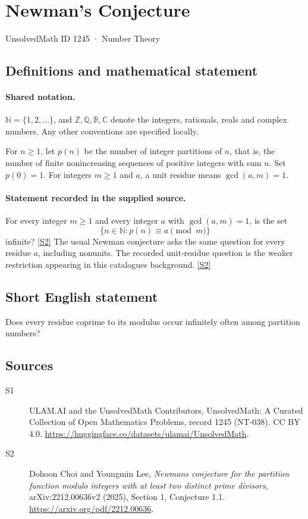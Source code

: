 \documentclass[11pt]{article}
\newcommand{\sref}[2]{\hyperlink{source:#1:#2}{[S#2]}}
\begin{document}
\setcounter{section}{1244}
\section{Newman's Conjecture}\label{1245}
{\small\sffamily UnsolvedMath ID 1245 · Number Theory}
\subsection{Definitions and mathematical statement}

\paragraph{Shared notation.}$\mathbb N=\{1,2,\ldots\}$, and $\mathbb Z,\mathbb Q,\mathbb R,\mathbb C$ denote the integers, rationals, reals and complex numbers. Any other conventions are specified locally.


For $n\geq1$, let $p(n)$ be the number of integer partitions of $n$, that is, the number of finite nonincreasing sequences of positive integers with sum $n$. Set $p(0)=1$. For integers $m\geq1$ and $a$, a unit residue means $\gcd(a,m)=1$.
\paragraph{Statement recorded in the supplied source.}
For every integer $m\geq1$ and every integer $a$ with $\gcd(a,m)=1$, is the set
\[
\{n\in\mathbb N:p(n)\equiv a\pmod m\}
\]
infinite? \sref{1245}{2}
The usual Newman conjecture asks the same question for every residue $a$, including nonunits. The recorded unit-residue question is the weaker restriction appearing in this catalogue\textquotesingle s background. \sref{1245}{2}
\subsection{Short English statement}
Does every residue coprime to its modulus occur infinitely often among partition numbers?
\subsection{Sources}
\begin{description}
\item[\hypertarget{source:1245:1}{S1}] ULAM.AI and the UnsolvedMath Contributors, UnsolvedMath: A Curated Collection of Open Mathematics Problems, record 1245 (NT-038). CC BY 4.0. \url{https://huggingface.co/datasets/ulamai/UnsolvedMath}.
\item[\hypertarget{source:1245:2}{S2}] Dohoon Choi and Youngmin Lee, \emph{Newman\textquotesingle s conjecture for the partition function modulo integers with at least two distinct prime divisors}, arXiv:2212.00636v2 (2025), Section 1, Conjecture 1.1. \url{https://arxiv.org/pdf/2212.00636}.
\end{description}
\label{end:1245}
\end{document}
